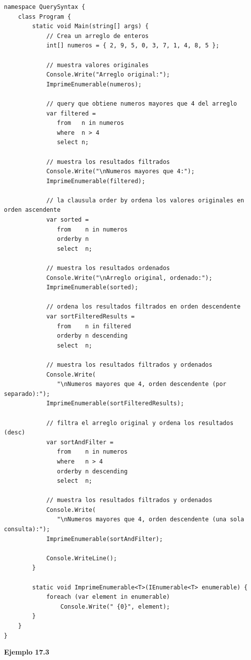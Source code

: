 \documentclass[12pt,a4paper]{report}
\begin{document}
\begin{lstlisting}
namespace QuerySyntax {
    class Program {
        static void Main(string[] args) {
            // Crea un arreglo de enteros
            int[] numeros = { 2, 9, 5, 0, 3, 7, 1, 4, 8, 5 };

            // muestra valores originales
            Console.Write("Arreglo original:");
            ImprimeEnumerable(numeros);
            
            // query que obtiene numeros mayores que 4 del arreglo
            var filtered =
               from   n in numeros
               where  n > 4
               select n;

            // muestra los resultados filtrados
            Console.Write("\nNumeros mayores que 4:");
            ImprimeEnumerable(filtered);

            // la clausula order by ordena los valores originales en orden ascendente            
            var sorted =
               from    n in numeros
               orderby n
               select  n;

            // muestra los resultados ordenados
            Console.Write("\nArreglo original, ordenado:");
            ImprimeEnumerable(sorted);

            // ordena los resultados filtrados en orden descendente            
            var sortFilteredResults =
               from    n in filtered
               orderby n descending
               select  n;

            // muestra los resultados filtrados y ordenados
            Console.Write(
               "\nNumeros mayores que 4, orden descendente (por separado):");
            ImprimeEnumerable(sortFilteredResults);

            // filtra el arreglo original y ordena los resultados (desc)            
            var sortAndFilter =
               from    n in numeros
               where   n > 4
               orderby n descending
               select  n;

            // muestra los resultados filtrados y ordenados
            Console.Write(
               "\nNumeros mayores que 4, orden descendente (una sola consulta):");
            ImprimeEnumerable(sortAndFilter);

            Console.WriteLine();
        }

        static void ImprimeEnumerable<T>(IEnumerable<T> enumerable) {
            foreach (var element in enumerable)
                Console.Write(" {0}", element);
        }
    }
}
\end{lstlisting}\textbf{Ejemplo 17.3}
\end{document}
